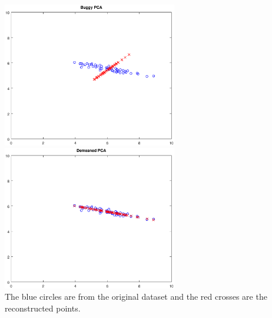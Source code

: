 \includegraphics[width=3in]{pcaprog/buggy_pca} \hspace{0.4in}
\includegraphics[width=3in]{pcaprog/demeaned_pca} \\
The blue circles are from the original dataset and the red crosses are the reconstructed points.

\vspace{0.2in}



